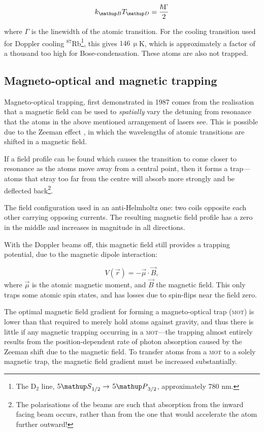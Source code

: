 \begin{equation}
k_\up{B} T_\up{D} = \frac{\hbar\Gamma}2
\end{equation}

where $\Gamma$ is the linewidth of the atomic transition. For the cooling transition used for Doppler cooling $^{87}$Rb\footnote{The D$_2$ line, $5\up{S}_{1/2}\rightarrow$ $5\up{P}_{3/2}$, approximately 780 nm.}, this gives $146\,\upmu$K, which is approximately a factor of a thousand too high for Bose-condensation. These atoms are also not trapped.

\subsection{Magneto-optical and magnetic trapping}

Magneto-optical trapping, first demonstrated in 1987 \cite{raab_trapping_1987} comes from the realisation that a magnetic field can be used to \emph{spatially} vary the detuning from resonance that the atoms in the above mentioned arrangement of lasers see. This is possible due to the Zeeman effect \cite{zeeman_influence_1897}, in which the wavelengths of atomic transitions are shifted in a magnetic field.

If a field profile can be found which causes the transition to come closer to resonance as the atoms move away from a central point, then it forms a trap---atoms  that stray too far from the centre will absorb more strongly and be deflected back\footnote{The polarisations of the beams are such that absorption from the inward facing beam occurs, rather than from the one that would accelerate the atom further outward!}.

The field configuration used in an anti-Helmholtz one: two coils opposite each other carrying opposing currents. The resulting magnetic field profile has a zero in the middle and increases in magnitude in all directions.

With the Doppler beams off, this magnetic field still provides a trapping potential, due to the magnetic dipole interaction:

\begin{equation}
V(\vec{r}) = -\vec \mu \cdot \vec B,
\end{equation}
where $\vec\mu$ is the atomic magnetic moment, and $\vec B$ the magnetic field. This only traps some atomic spin states, and has losses due to spin-flips \cite{brink_majorana_2006} near the field zero.

The optimal magnetic field gradient for forming a magneto-optical trap (\textsc{mot}) is lower than that required to merely hold atoms against gravity, and thus there is little if any magnetic trapping occurring in a \textsc{mot}---the trapping almost entirely results from the position-dependent rate of photon absorption caused by the Zeeman shift due to the magnetic field. To transfer atoms from a \textsc{mot} to a solely magnetic trap, the magnetic field gradient must be increased substantially.

